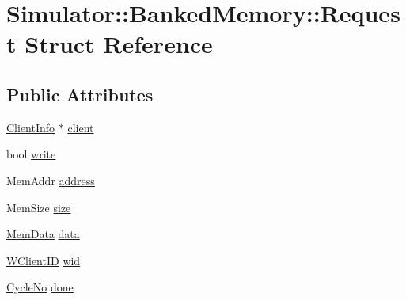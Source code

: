 \hypertarget{struct_simulator_1_1_banked_memory_1_1_request}{\section{Simulator\+:\+:Banked\+Memory\+:\+:Request Struct Reference}
\label{struct_simulator_1_1_banked_memory_1_1_request}
}
\subsection*{Public Attributes}
\begin{DoxyCompactItemize}
\item 
\hyperlink{struct_simulator_1_1_banked_memory_1_1_client_info}{Client\+Info} $\ast$ \hyperlink{struct_simulator_1_1_banked_memory_1_1_request_aa5d5271928065fc74e811d30fdb52654}{client}
\item 
bool \hyperlink{struct_simulator_1_1_banked_memory_1_1_request_a3a76d18874a82cf28d53f46876b07c09}{write}
\item 
Mem\+Addr \hyperlink{struct_simulator_1_1_banked_memory_1_1_request_a27c745dd3a3af9793afd99118aad022b}{address}
\item 
Mem\+Size \hyperlink{struct_simulator_1_1_banked_memory_1_1_request_afae67fe8f484af4a8c5de28dbf694ea1}{size}
\item 
\hyperlink{struct_simulator_1_1_mem_data}{Mem\+Data} \hyperlink{struct_simulator_1_1_banked_memory_1_1_request_af61f9006b2e4aa2271ffaaa335aa7c02}{data}
\item 
\hyperlink{namespace_simulator_a0de605c35951a450d074222efcef6359}{W\+Client\+I\+D} \hyperlink{struct_simulator_1_1_banked_memory_1_1_request_a16196962c33ac8b54586397859d458b0}{wid}
\item 
\hyperlink{namespace_simulator_a928f1e2101eba21bb0fe409e8c9ce573}{Cycle\+No} \hyperlink{struct_simulator_1_1_banked_memory_1_1_request_af32de69aa69857c9cf10e277755b58ce}{done}
\end{DoxyCompactItemize}


